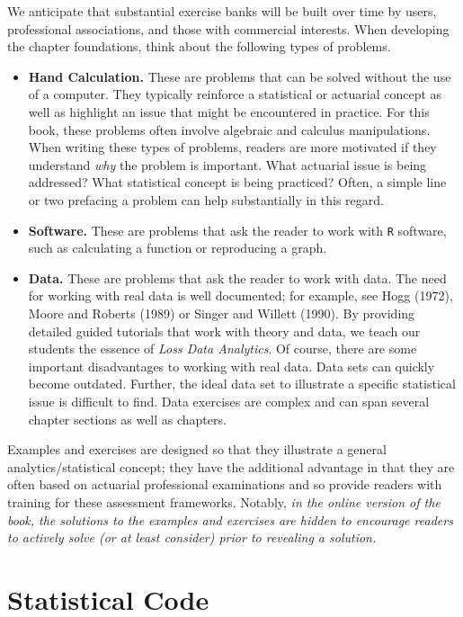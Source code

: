 \documentclass[]{book}
\providecommand{\tightlist}{%
  \setlength{\itemsep}{0pt}\setlength{\parskip}{0pt}}
\theoremstyle{definition}
\theoremstyle{definition}
\theoremstyle{definition}
\theoremstyle{remark}
\begin{document}
We anticipate that substantial exercise banks will be built over time by
users, professional associations, and those with commercial interests.
When developing the chapter foundations, think about the following types
of problems.

\begin{itemize}
\tightlist
\item
  \textbf{Hand Calculation.} These are problems that can be solved
  without the use of a computer. They typically reinforce a statistical
  or actuarial concept as well as highlight an issue that might be
  encountered in practice. For this book, these problems often involve
  algebraic and calculus manipulations. When writing these types of
  problems, readers are more motivated if they understand \emph{why} the
  problem is important. What actuarial issue is being addressed? What
  statistical concept is being practiced? Often, a simple line or two
  prefacing a problem can help substantially in this regard.
\item
  \textbf{Software.} These are problems that ask the reader to work with
  \texttt{R} software, such as calculating a function or reproducing a
  graph.
\item
  \textbf{Data.} These are problems that ask the reader to work with
  data. The need for working with real data is well documented; for
  example, see Hogg (1972), Moore and Roberts (1989) or Singer and
  Willett (1990). By providing detailed guided tutorials that work with
  theory and data, we teach our students the essence of \emph{Loss Data
  Analytics}. Of course, there are some important disadvantages to
  working with real data. Data sets can quickly become outdated.
  Further, the ideal data set to illustrate a specific statistical issue
  is difficult to find. Data exercises are complex and can span several
  chapter sections as well as chapters.
\end{itemize}

Examples and exercises are designed so that they illustrate a general
analytics/statistical concept; they have the additional advantage in
that they are often based on actuarial professional examinations and so
provide readers with training for these assessment frameworks. Notably,
\emph{in the online version of the book, the solutions to the examples
and exercises are hidden to encourage readers to actively solve (or at
least consider) prior to revealing a solution.}

\section{Statistical Code}\label{statistical-code}
\end{document}
